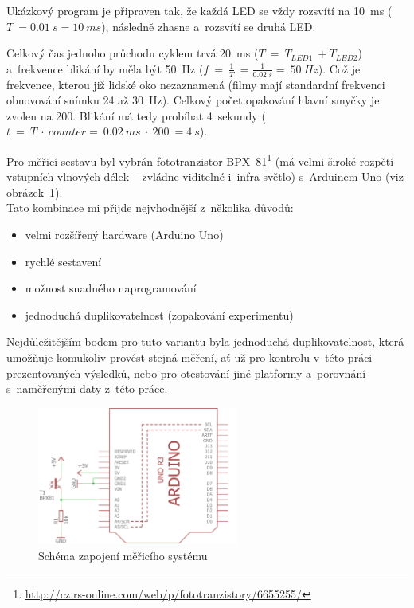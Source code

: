 Ukázkový program je připraven tak, že každá LED se vždy rozsvítí na 10~ms ($T~= 0.01~s =10~ms$), následně zhasne a~rozsvítí se druhá LED. 

Celkový čas jednoho průchodu cyklem trvá 20~ms ($T~=~T_{LED1}~+ T_{LED2}$) a~frekvence blikání by měla být 50~Hz ($f~=~\frac{1}{T}~= \frac{1}{0.02~s} =~50~Hz$). 
Což je frekvence, kterou již lidské oko nezaznamená (filmy mají standardní frekvenci obnovování snímku 24 až 30~Hz). %
Celkový počet opakování hlavní smyčky je zvolen na 200. 
Blikání má tedy probíhat 4~sekundy ($t~=~T~\cdot~counter =~0.02~ms~\cdot~200~= 4~s$).

Pro měřicí sestavu byl vybrán fototranzistor BPX~81\footnote{\url{http://cz.rs-online.com/web/p/fototranzistory/6655255/}} (má velmi široké rozpětí vstupních vlnových délek -- zvládne viditelné i~infra světlo) s~Arduinem Uno (viz obrázek~\ref{fig:arduino-measuring-system}). \\

Tato kombinace mi přijde nejvhodnější z~několika důvodů: 

\begin{itemize}
	\item velmi rozšířený hardware (Arduino Uno)
	\item rychlé sestavení
	\item možnost snadného naprogramování
	\item jednoduchá duplikovatelnost (zopakování experimentu)
\end{itemize}  

Nejdůležitějším bodem pro tuto variantu byla jednoduchá duplikovatelnost, která umožňuje komukoliv provést stejná měření, ať už pro kontrolu v~této práci prezentovaných výsledků, nebo pro otestování jiné platformy a~porovnání s~naměřenými daty z~této práce.

\begin{figure}[h]
	\centering
	\includegraphics[width=250px]{images/measuring-arduino-system_schema.png}	
	\caption[Schéma zapojení měřicího systému]{Schéma zapojení měřicího systému}
	\label{fig:arduino-measuring-system}
\end{figure}

